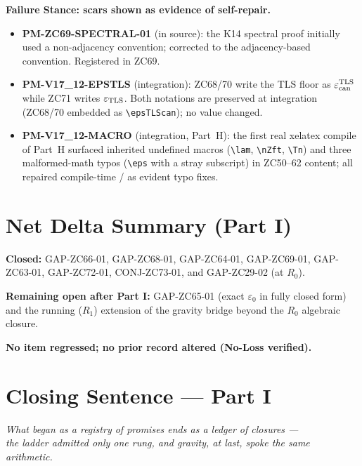 \documentclass[12pt, a4paper]{article}
\begin{document}
\begin{openqbox}[title={Phase Misalignments recorded with Part I}]
\textbf{Failure Stance: scars shown as evidence of self-repair.}
\begin{itemize}[leftmargin=1.5em]
\item \textbf{PM-ZC69-SPECTRAL-01} (in source): the K14 spectral proof
  initially used a non-adjacency convention; corrected to the
  adjacency-based convention. Registered in ZC69.
\item \textbf{PM-V17\_12-EPSTLS} (integration): ZC68/70 write the TLS floor
  as $\varepsilon_{\rm can}^{\rm TLS}$ while ZC71 writes $\varepsilon_{\rm
  TLS}$. Both notations are preserved at integration (ZC68/70 embedded as
  \texttt{\textbackslash epsTLScan}); no value changed.
\item \textbf{PM-V17\_12-MACRO} (integration, Part~H): the first real
  xelatex compile of Part~H surfaced inherited undefined macros
  (\texttt{\textbackslash lam}, \texttt{\textbackslash nZft},
  \texttt{\textbackslash Tn}) and three malformed-math typos
  (\texttt{\textbackslash eps} with a stray subscript) in ZC50--62
  content; all repaired compile-time / as evident typo fixes.
\end{itemize}
\end{openqbox}

\section{Net Delta Summary (Part I)}
\label{sec:xlviii-delta}

\begin{conmapbox}[title={Part I net effect}]
\textbf{Closed:} GAP-ZC66-01, GAP-ZC68-01, GAP-ZC64-01, GAP-ZC69-01,
GAP-ZC63-01, GAP-ZC72-01, CONJ-ZC73-01, and GAP-ZC29-02 (at $R_0$).

\smallskip
\textbf{Remaining open after Part I:} GAP-ZC65-01 (exact $\varepsilon_0$
in fully closed form) and the running ($R_1$) extension of the gravity
bridge beyond the $R_0$ algebraic closure.

\smallskip
\textbf{No item regressed; no prior record altered (No-Loss verified).}
\end{conmapbox}

\bigskip
\section{Closing Sentence --- Part I}
\label{sec:xlviii-closing}

\begin{center}
\textit{What began as a registry of promises ends as a ledger of
closures ---\\
the ladder admitted only one rung, and gravity, at last,
spoke the same arithmetic.}
\end{center}
\end{document}

